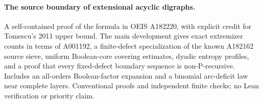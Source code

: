 \paragraph{The source boundary of extensional acyclic digraphs.}
A self-contained proof of the formula in OEIS A182220, with explicit credit
for Tomescu's 2011 upper bound. The main development gives exact extremizer
counts in terms of A001192, a finite-defect specialization of the known
A182162 source sieve, uniform Boolean-core covering estimates, dyadic entropy
profiles, and a proof that every fixed-defect boundary sequence is
non-P-recursive. Includes an all-orders Boolean-factor expansion and a
binomial arc-deficit law near complete layers. Conventional proofs and
independent finite checks; no Lean verification or priority claim.

